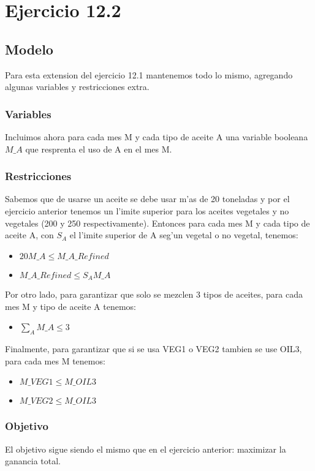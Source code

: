 \section{Ejercicio 12.2}
\subsection{Modelo}
Para esta extension del ejercicio 12.1 mantenemos todo lo mismo, agregando algunas variables y restricciones extra.
\subsubsection{Variables}
Incluimos ahora para cada mes M y cada tipo de aceite A una variable booleana $M\_A$ que resprenta el uso de A en el mes M.
\subsubsection{Restricciones}
Sabemos que de usarse un aceite se debe usar m'as de 20 toneladas y por el ejercicio anterior tenemos un l'imite superior para los aceites vegetales y no vegetales (200 y 250 respectivamente). Entonces para cada mes M y cada tipo de aceite A, con $S_{A}$ el l'imite superior de A seg'un vegetal o no vegetal, tenemos:
\begin{itemize}
\item$20 M\_A \leq M\_A\_Refined$
\item$M\_A\_Refined \leq S_{A} M\_A$
\end{itemize}
Por otro lado, para garantizar que solo se mezclen 3 tipos de aceites, para cada mes M y tipo de aceite A tenemos:
\begin{itemize}
\item$\sum_{A} M\_A \leq 3$
\end{itemize}
Finalmente, para garantizar que si se usa VEG1 o VEG2 tambien se use OIL3, para cada mes M tenemos:
\begin{itemize}
\item$M\_VEG1 \leq M\_OIL3$
\item$M\_VEG2 \leq M\_OIL3$
\end{itemize}
\subsubsection{Objetivo}
El objetivo sigue siendo el mismo que en el ejercicio anterior: maximizar la ganancia total.
